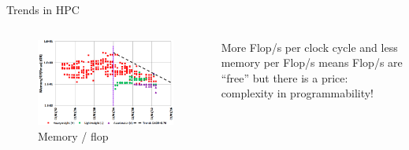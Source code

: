 \documentclass[10pt,times]{beamer}
\begin{document}
\begin{frame}{Trends in HPC}
\begin{columns}
\begin{figure}
\includegraphics[width=\linewidth]{figs/memory_flops.png}
\caption*{Memory / flop}
\end{figure}
More Flop/s per clock cycle and less memory per Flop/s means Flop/s
are ``free'' but there is a price: complexity in programmability!

\end{columns}
\end{frame}
\end{document}
